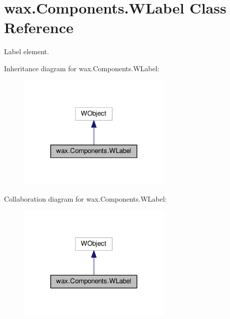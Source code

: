 \hypertarget{classwax_1_1Components_1_1WLabel}{}\section{wax.\+Components.\+W\+Label Class Reference}
\label{classwax_1_1Components_1_1WLabel}


Label element.  




Inheritance diagram for wax.\+Components.\+W\+Label\+:
\nopagebreak
\begin{figure}[H]
\begin{center}
\leavevmode
\includegraphics[width=209pt]{classwax_1_1Components_1_1WLabel__inherit__graph}
\end{center}
\end{figure}


Collaboration diagram for wax.\+Components.\+W\+Label\+:
\nopagebreak
\begin{figure}[H]
\begin{center}
\leavevmode
\includegraphics[width=209pt]{classwax_1_1Components_1_1WLabel__coll__graph}
\end{center}
\end{figure}
